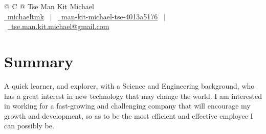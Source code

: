 \documentclass[a4paper,12pt]{article}
\begin{document}
\pagestyle{empty} 


\begin{tabularx}{\linewidth}{@{} C @{}}
\Huge{Tse Man Kit Michael} \\[7.5pt]
\href{https://github.com/michaeltmk}{\raisebox{-0.05\height}\faGithub\ michaeltmk} \ $|$ \ \href{https://linkedin.com/in/man-kit-michael-tse-4013a5176}{\raisebox{-0.05\height}\faLinkedin\ man-kit-michael-tse-4013a5176} \ $|$ \ \href{mailto:tse.man.kit.michael@gmail.com}{\raisebox{-0.05\height}\faEnvelope\ tse.man.kit.michael@gmail.com} \\
\end{tabularx}


\section{Summary}
A quick learner, and explorer, with a Science and Engineering background, who has a great interest in new technology that may change the world. I am interested in working for a fast-growing and challenging company that will encourage my growth and development, so as to be the most efficient and effective employee I can possibly be.

\end{document}
